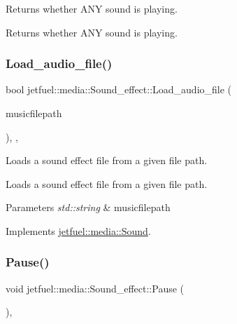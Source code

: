 Returns whether A\+NY sound is playing. 

Returns whether A\+NY sound is playing. \mbox{\label{classjetfuel_1_1media_1_1Sound__effect_a1ad701cd2318e960bde2ab063aeabb75}} 
\subsubsection{\texorpdfstring{Load\+\_\+audio\+\_\+file()}{Load\_audio\_file()}}
{\footnotesize\ttfamily bool jetfuel\+::media\+::\+Sound\+\_\+effect\+::\+Load\+\_\+audio\+\_\+file (\begin{DoxyParamCaption}\item[{const std\+::string}]{musicfilepath }\end{DoxyParamCaption})\hspace{0.3cm}{\ttfamily [inline]}, {\ttfamily [override]}, {\ttfamily [virtual]}}



Loads a sound effect file from a given file path. 

Loads a sound effect file from a given file path.


\begin{DoxyParams}{Parameters}
{\em std\+::string} & musicfilepath \\
\hline
\end{DoxyParams}


Implements \hyperlink{classjetfuel_1_1media_1_1Sound_ab18ff9b8dd2001fa11b17649a6a3defb}{jetfuel\+::media\+::\+Sound}.

\mbox{\label{classjetfuel_1_1media_1_1Sound__effect_a5fa5bb67a349bac545f233a6aa8a030d}} 
\subsubsection{\texorpdfstring{Pause()}{Pause()}}
{\footnotesize\ttfamily void jetfuel\+::media\+::\+Sound\+\_\+effect\+::\+Pause (\begin{DoxyParamCaption}{ }\end{DoxyParamCaption})\hspace{0.3cm}{\ttfamily [override]}, {\ttfamily [virtual]}}



